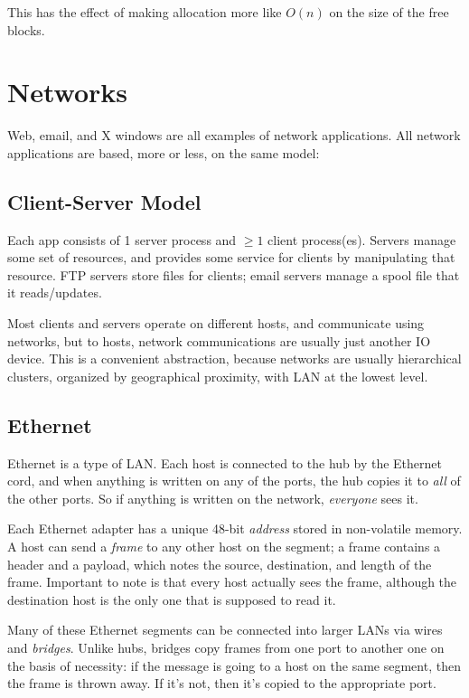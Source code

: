 \documentclass[fleqn]{article}
\begin{document}
This has the effect of making allocation more like $O(n)$ on the size of the free blocks.




\section{Networks}

Web, email, and X windows are all examples of network applications. All network applications are based, more or less, on the same model:

\subsection{Client-Server Model}

Each app consists of 1 server process and $\ge 1$ client process(es). Servers manage some set of resources, and provides some service for clients by manipulating that resource. FTP servers store files for clients; email servers manage a spool file that it reads/updates.

Most clients and servers operate on different hosts, and communicate using networks, but to hosts, network communications are usually just another IO device. This is a convenient abstraction, because networks are usually hierarchical clusters, organized by geographical proximity, with LAN at the lowest level.

\subsection{Ethernet}

Ethernet is a type of LAN. Each host is connected to the hub by the Ethernet cord, and when anything is written on any of the ports, the hub copies it to \textit{all} of the other ports. So if anything is written on the network, \textit{everyone} sees it.

Each Ethernet adapter has a unique 48-bit \textit{address} stored in non-volatile memory. A host can send a \textit{frame} to any other host on the segment; a frame contains a header and a payload, which notes the source, destination, and length of the frame. Important to note is that every host actually sees the frame, although the destination host is the only one that is supposed to read it.

Many of these Ethernet segments can be connected into larger LANs via wires and \textit{bridges}. Unlike hubs, bridges copy frames from one port to another one on the basis of necessity: if the message is going to a host on the same segment, then the frame is thrown away. If it's not, then it's copied to the appropriate port.
\end{document}
